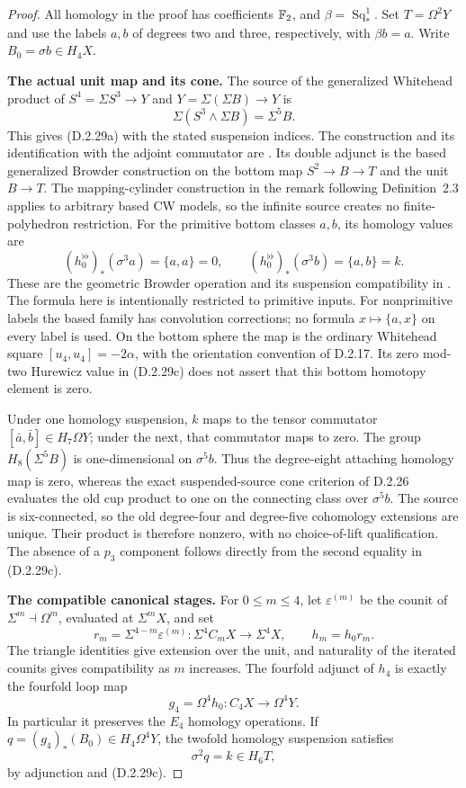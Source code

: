 \begin{proof}
All homology in the proof has coefficients $\mathbb F_2$, and
$\beta=\operatorname{Sq}_*^1$.  Set $T=\Omega^2Y$ and
use the labels $a,b$ of degrees two and three, respectively,
with $\beta b=a$.  Write $B_0=\sigma b\in H_4X$.

\medskip\noindent
\textbf{The actual unit map and its cone.}
The source of the generalized Whitehead product of
$S^4=\Sigma S^3\to Y$ and $Y=\Sigma(\Sigma B)\to Y$ is
\[
 \Sigma(S^3\wedge\Sigma B)=\Sigma^5B.
\]
This gives \textup{(D.2.29a)} with the stated suspension indices.
The construction and its identification with the adjoint commutator
are \cite[Definitions~2.2--2.3 and Theorem~2.4,
pp.~10--13]{EH5Arkowitz1962}.  Its double adjunct is the
based generalized Browder construction on the bottom map
$S^2\to B\to T$ and the unit $B\to T$.
The mapping-cylinder construction in the remark following
Definition~2.3 applies to arbitrary based CW models, so the
infinite source creates no finite-polyhedron restriction.
For the primitive bottom classes $a,b$, its homology values are
\[
 (h_0^{\flat\flat})_*(\sigma^3a)=\{a,a\}=0,
 \qquad
 (h_0^{\flat\flat})_*(\sigma^3b)=\{a,b\}=k.
 \tag{D.2.29c}
\]
These are the geometric Browder operation and its suspension
compatibility in \cite[Chapter~III, Theorems~1.2--1.4,
pp.~216--219]{I_CohenLadaMay1976}.
The formula here is intentionally restricted to primitive inputs.
For nonprimitive labels the based family has convolution corrections;
no formula $x\mapsto\{a,x\}$ on every label is used.
On the bottom sphere the map is the ordinary Whitehead square
$[u_4,u_4]=-2\alpha$, with the orientation convention of D.2.17.
Its zero mod-two Hurewicz value in \textup{(D.2.29c)} does
not assert that this bottom homotopy element is zero.

Under one homology suspension, $k$ maps to the tensor
commutator $[\bar a,\bar b]\in H_7\Omega Y$; under the next,
that commutator maps to zero.  The group
$H_8(\Sigma^5B)$ is one-dimensional on $\sigma^5b$.
Thus the degree-eight attaching homology map is zero, whereas
the exact suspended-source cone criterion of D.2.26 evaluates
the old cup product to one on the connecting class over
$\sigma^5b$.  The source is six-connected, so the old
degree-four and degree-five cohomology extensions are unique.
Their product is therefore nonzero, with no choice-of-lift
qualification.  The absence of a $p_3$ component follows
directly from the second equality in \textup{(D.2.29c)}.

\medskip\noindent
\textbf{The compatible canonical stages.}
For $0\le m\le4$, let $\varepsilon^{(m)}$ be the counit
of $\Sigma^m\dashv\Omega^m$, evaluated at $\Sigma^mX$, and set
\[
 r_m=\Sigma^{4-m}\varepsilon^{(m)}:
       \Sigma^4C_mX\longrightarrow\Sigma^4X,
 \qquad h_m=h_0r_m.
 \tag{D.2.29d}
\]
The triangle identities give extension over the unit, and
naturality of the iterated counits gives compatibility as $m$
increases.  The fourfold adjunct of $h_4$ is exactly the
fourfold loop map
\[
 g_4=\Omega^4h_0:C_4X\longrightarrow\Omega^4Y.
 \tag{D.2.29e}
\]
In particular it preserves the $E_4$ homology operations.
If $q=(g_4)_*(B_0)\in H_4\Omega^4Y$, the twofold
homology suspension satisfies
\[
 \sigma^2q=k\in H_6T,
 \tag{D.2.29f}
\]
by adjunction and \textup{(D.2.29c)}.


\end{proof}
